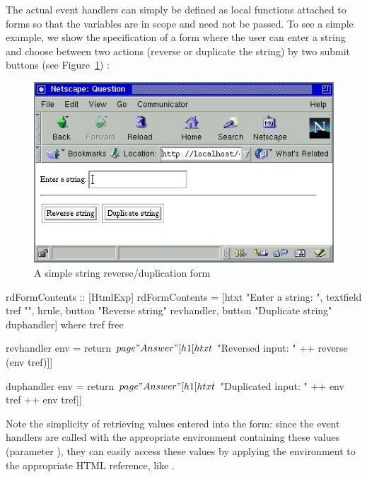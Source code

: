 The actual event handlers can simply be defined as local functions
attached to forms so that the  variables are in scope
and need not be passed.
To see a simple example, we show the specification of
a form where the user can enter a string and choose between two
actions (reverse or duplicate the string) by two submit buttons
(see Figure~\ref{fig-revdup}) :
%
\begin{figure}[t]
\begin{center}
\includegraphics[scale=0.8]{PICTURES/revdup.jpg}
\end{center}\vspace{-3ex}
\caption{A simple string reverse/duplication form\label{fig-revdup}}
\end{figure}
%
\begin{curry}
rdFormContents :: [HtmlExp]
rdFormContents =
  [htxt "Enter a string: ", textfield tref "", hrule,
   button "Reverse string"   revhandler,
   button "Duplicate string" duphandler]
 where
   tref free

   revhandler env = return $ page "Answer"
     [h1 [htxt $ "Reversed input: " ++ reverse (env tref)]]

   duphandler env = return $ page "Answer"
     [h1 [htxt $ "Duplicated input: " ++ env tref ++ env tref]]
\end{curry}
%
Note the simplicity of retrieving values entered into the form:
since the event handlers are called with the appropriate environment
containing these values (parameter ),
they can easily access these values
by applying the environment to the appropriate HTML reference,
like .

